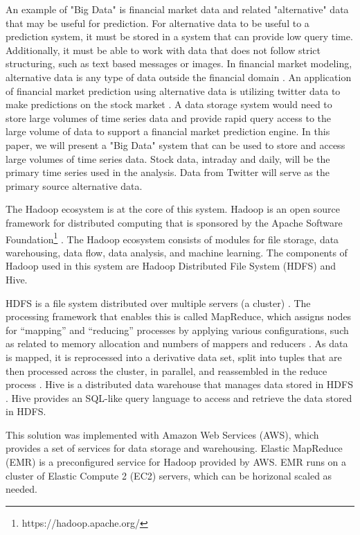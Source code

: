 \documentclass[journal]{IEEEtran}
\begin{document}

An example of "Big Data" is financial market data and
 related "alternative" data that may be useful for prediction.
For alternative data to be useful to a prediction system,
 it must be stored in a system that can provide low query time.
Additionally, it must be able to work with data that does not follow strict structuring,
 such as text based messages or images.
In financial market modeling, alternative data is any type of data outside the
 financial domain \cite{xiao2018trading}.
An application of financial market prediction using alternative data is
 utilizing twitter data to make predictions on the stock market \cite{twittermood}.
A data storage system would need to store large volumes of time series data and
 provide rapid query access to the large volume of data to support a financial 
 market prediction engine.
In this paper, we will present a "Big Data" system that can be used to store and
 access large volumes of time series data. 
Stock data, intraday and daily,
 will be the primary time series used in the analysis.
Data from Twitter will serve as the primary source alternative data.


The Hadoop ecosystem is at the core of this system.
Hadoop is an open source framework for distributed computing
 that is sponsored by the 
 Apache Software Foundation\footnote{https://hadoop.apache.org/} \cite{HDFSarchitecture}.
The Hadoop ecosystem consists of modules for file storage, data warehousing,
 data flow, data analysis, and machine learning.
The components of Hadoop used in this system are
 Hadoop Distributed File System (HDFS) and Hive.

HDFS is a file system distributed over multiple servers (a cluster) \cite{HDFSarchitecture}.
The processing framework that enables this is called MapReduce, 
which assigns nodes for ``mapping'' and ``reducing'' processes by applying  
various configurations, such as related to memory allocation and numbers
of mappers and reducers \cite{MappingReducing}.
As data is mapped, it is reprocessed into a derivative data set,
split into tuples that are then processed across the cluster, in parallel,
and reassembled in the reduce process \cite{MappingReducing}.
Hive is a distributed data warehouse that manages data stored in HDFS \cite{HDFSarchitecture}.
Hive provides an SQL-like query language to access and
 retrieve the data stored in HDFS.

This solution was implemented with Amazon Web Services (AWS),
 which provides a set of services for data storage and warehousing.
Elastic MapReduce (EMR) is a preconfigured service for Hadoop provided by AWS.
EMR runs on a cluster of Elastic Compute 2 (EC2) servers,
 which can be horizonal scaled as needed.
\end{document}
